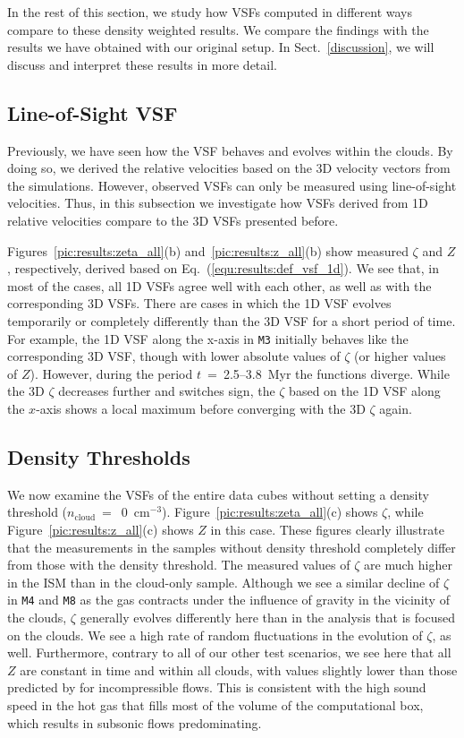 \documentclass{aa}		%
\begin{document}
In the rest of this section, we study how VSFs computed in different ways compare to these density weighted results.
We compare the findings with the results we have obtained with our original setup.
In Sect.~\ref{discussion}, we will discuss and interpret these results in more detail.


\subsection{Line-of-Sight VSF}\label{results:1d}

Previously, we have seen how the VSF behaves and evolves within the clouds.
By doing so, we derived the relative velocities based on the 3D velocity vectors from the simulations.
However, observed VSFs can only be measured using line-of-sight velocities.
Thus, in this subsection we investigate how VSFs derived from 1D relative velocities compare to the 3D VSFs presented before.

Figures~\ref{pic:results:zeta_all}(b) and~\ref{pic:results:z_all}(b) show measured $\zeta$ and $Z$, respectively, derived based on Eq.~(\ref{equ:results:def_vsf_1d}). 
We see that, in most of the cases, all 1D VSFs agree well with each other, as well as with the corresponding 3D VSFs.
There are cases in which the 1D VSF evolves temporarily or completely differently than the 3D VSF for a short period of time.
For example, the 1D VSF along the x-axis in \texttt{M3} initially behaves like the corresponding 3D VSF, though with lower absolute values of $\zeta$ (or higher values of $Z$).
However, during the period $t$~=~2.5--3.8~Myr the functions diverge. 
While the 3D $\zeta$ decreases further and switches sign, the $\zeta$ based on the 1D VSF along the $x$-axis shows a local maximum before converging with the 3D $\zeta$ again. 


\subsection{Density Thresholds}\label{results:densthres}

We now examine the VSFs of the entire data cubes without setting a density threshold ($n_\mathrm{cloud}~=$~0~cm$^{-3}$).  Figure~\ref{pic:results:zeta_all}(c) shows $\zeta$, while Figure~\ref{pic:results:z_all}(c) shows $Z$ in this case.
These figures clearly illustrate that the measurements in the samples without density threshold completely differ from those with the density threshold.
The measured values of $\zeta$ are much higher in the ISM than in the cloud-only sample.
Although we see a similar decline of $\zeta$ in \texttt{M4} and \texttt{M8} as the gas contracts under the influence of gravity in the vicinity of the clouds, $\zeta$ generally evolves differently here than in the analysis that is focused on the clouds.
We see a high rate of random fluctuations in the evolution of $\zeta$, as well.
Furthermore, contrary to all of our other test scenarios, we see here that all $Z$ are constant in time and within all clouds, with values slightly lower than those predicted by \citet{She1994} for incompressible flows.  
This is consistent with the high sound speed in the hot gas that fills most of the volume of the computational box, which results in subsonic flows predominating.
\end{document}
